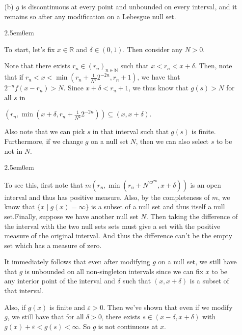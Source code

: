 \documentclass{book}
\newcommand{\exTwoP}{%
   \color{RedViolet}%
   \fontsize{13}{15}\selectfont%
}
\newcommand{\exPPP}{%
   \color{VioletRed}%
   \fontsize{12}{14}\selectfont%
}
\newenvironment{myIndent}{%
   \begin{adjustwidth}{2.5em}{0em}%
}{%
   \end{adjustwidth}%
}
\newcommand{\retTwo}{\hfill\bigbreak}
\begin{document}
\begin{enumerate}
\begin{myIndent}
      {\centering $g(x) = \sum\limits_{n = 1}^\infty 2^{-n} f(x - r_n) < \infty$ almost everywhere.\retTwo\par}
   \end{myIndent}

   \item[(b)] $g$ is discontinuous at every point and unbounded on every interval, and it remains so after any modification on a Lebesgue null set.
   
   \begin{myIndent}\exTwoP
      To start, let's fix $x \in \mathbb{R}$ and $\delta \in (0, 1)$. Then consider any $N > 0$.\retTwo

      Note that there exists $r_n \in (r_n)_{n \in \mathbb{N}}$ such that $x < r_n < x + \delta$. Then, note that if $r_n < x < \min(r_n + \frac{1}{N^2}2^{-2n} ,r_n + 1)$, we have that $2^{-n}f(x - r_n) > N$. Since $x + \delta < r_n + 1$, we thus know that $g(s) > N$ for all $s$ in
      
      {\centering $(r_n, \min(x + \delta, r_n + \frac{1}{N^2}2^{-2n})) \subseteq (x, x + \delta)$.\retTwo\par}

      Also note that we can pick $s$ in that interval such that $g(s)$ is finite. Furthermore, if we change $g$ on a null set $N$, then we can also select $s$ to be not in $N$.
      \begin{myIndent}\exPPP
         To see this, first note that $m(r_n, \min(r_n + N^22^{2n}, x + \delta))$ is an open interval and thus has positive measure. Also, by the completeness of $m$, we know that $\{x \mid g(x) = \infty\}$ is a subset of a null set and thus itself a null set.\newpage Finally, suppose we have another null set $N$. Then taking the difference of the interval with the two null sets sets must give a set with the positive measure of the original interval. And thus the difference can't be the empty set which has a measure of zero.\retTwo
      \end{myIndent}

      It immediately follows that even after modifying $g$ on a null set, we still have that $g$ is unbounded on all non-singleton intervals since we can fix $x$ to be any interior point of the interval and $\delta$ such that $(x, x + \delta)$ is a subset of that interval.\retTwo

      Also, if $g(x)$ is finite and $\varepsilon > 0$. Then we've shown that even if we modify\\ $g$, we still have that for all $\delta > 0$, there exists $s \in (x - \delta, x + \delta)$ with\\ $g(x) + \varepsilon < g(s) < \infty$. So $g$ is not continuous at $x$.\retTwo


\end{myIndent}
\end{enumerate}
\end{document}
